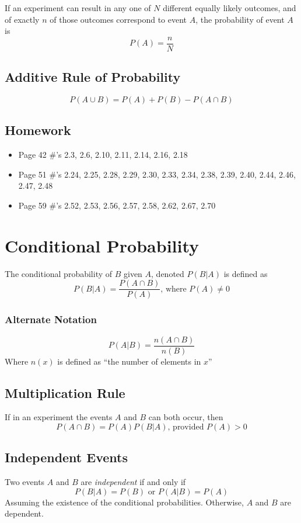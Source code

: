 \documentclass{book}
\newcommand{\note}[1]{\marginpar{\emph{Note: #1}}}
\begin{document}
If an experiment can result in any one of $N$ different equally likely outcomes, and of exactly $n$ of those outcomes correspond to event $A$, the probability of event $A$ is $$P(A) = \frac{n}{N}$$

\subsection{Additive Rule of Probability}

$$P(A \cup B) = P(A) + P(B) - P(A \cap B)$$

\subsection{Homework}
\begin{itemize}
\item Page 42 \#'s 2.3, 2.6, 2.10, 2.11, 2.14, 2.16, 2.18
\item Page 51 \#'s 2.24, 2.25, 2.28, 2.29, 2.30, 2.33, 2.34, 2.38, 2.39, 2.40, 2.44, 2.46, 2.47, 2.48
\item Page 59 \#'s 2.52, 2.53, 2.56, 2.57, 2.58, 2.62, 2.67, 2.70
\end{itemize}

\section{Conditional Probability}

The conditional probability of $B$ given $A$, denoted $P(B|A)$ is defined as $$P(B|A) = \frac{P(A \cap B)}{P(A)} \text{, where } P(A) \ne 0 $$
\note{This is a filter}

\subsubsection{Alternate Notation}
$$P(A|B) =\frac{n(A \cap B)}{n(B)}$$
Where $n(x)$ is defined as \enquote{the number of elements in $x$} 

\subsection{Multiplication Rule}
If in an experiment the events $A$ and $B$ can both occur, then $$P(A\cap B) = P(A)P(B|A)\text{, provided } P(A) > 0$$

\subsection{Independent Events}
Two events $A$ and $B$ are \emph{independent} if and only if 
$$P(B|A) = P(B) \text{ or } P(A|B)=P(A)$$
Assuming the existence of the conditional probabilities. Otherwise, $A$ and $B$ are dependent.
\end{document}
